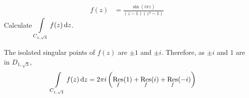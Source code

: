 \documentclass[titlepage, fleqn, a4paper, 12pt, twoside]{article}
\theoremstyle{definition}
\theoremstyle{theorem}
\DeclareMathOperator{\Res}{Res}
\begin{document}
\begin{question}{11}
	\begin{align*}
		f(z) & = \frac{\sin(i \pi z)}{(z - 1) \left( z^4 - 1 \right)}
	\end{align*}
	Calculate $\displaystyle \int\limits_{C_{1,\sqrt{3}}} f(z) \dif z$.
\end{question}

\begin{solution}
	The isolated singular points of $f(z)$ are $\pm 1$ and $\pm i$.
	Therefore, as $\pm i$ and $1$ are in $D_{1,\sqrt{3}}$,
	\begin{align*}
		\int\limits_{C_{1,\sqrt{3}}} f(z) \dif z & = 2 \pi i \left( \Res_{f}(1) + \Res_{f}(i) + \Res_{f}(-i) \right)
	\end{align*}
\end{solution}
\end{document}
